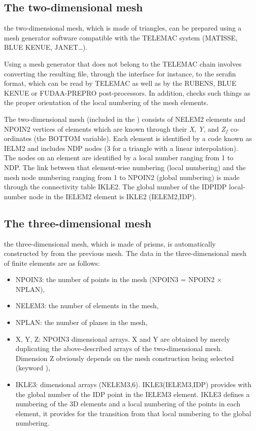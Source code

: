\subsection{The two-dimensional mesh}

the two-dimensional mesh, which is made of triangles, can be prepared using a
mesh generator software compatible with the TELEMAC system (MATISSE,
BLUE KENUE, JANET\dots ).

Using a mesh generator that does not belong to the TELEMAC chain involves
converting the resulting file, through the \stbtel interface for instance, to
the serafin format, which can be read by TELEMAC as well as by the RUBENS, BLUE
KENUE or FUDAA-PREPRO post-processors. In addition, \stbtel checks such
things as the proper orientation of the local numbering of the mesh elements.

The two-dimensional mesh (included in the ) consists of
NELEM2 elements and NPOIN2 vertices of elements which are known through their
\textit{X}, \textit{Y}, and\textit{ Z}${}_{f}$ co-ordinates (the BOTTOM
variable). Each element is identified by a code known as IELM2 and includes NDP
nodes (3 for a triangle with a linear interpolation). The nodes on an element
are identified by a local number ranging from 1 to NDP. The link between that
element-wise numbering (local numbering) and the mesh node numbering ranging
from 1 to NPOIN2 (global numbering) is made through the connectivity table
IKLE2. The global number of the IDPIDP local-number node in the IELEM2 element
is IKLE2 (IELEM2,IDP).


\subsection{The three-dimensional mesh}

the three-dimensional mesh, which is made of prisms, is automatically
constructed by  from the previous mesh. The data in the
three-dimensional mesh of finite elements are as follows:

\begin{itemize}
\item NPOIN3: the number of points in the mesh (NPOIN3 = NPOIN2 $\times$
NPLAN),
\item NELEM3: the number of elements in the mesh,
\item NPLAN: the number of planes in the mesh,
\item X, Y, Z: NPOIN3 dimensional arrays. X and Y are obtained by merely
duplicating the above-described arrays of the two-dimensional mesh. Dimension Z
obviously depends on the mesh construction being selected (keyword ),
\item IKLE3: dimensional arrays (NELEM3,6). IKLE3(IELEM3,IDP) provides with the
global number of the IDP point in the IELEM3 element. IKLE3 defines a numbering
of the 3D elements and a local numbering of the points in each element, it
provides for the transition from that local numbering to the global numbering.
\end{itemize}

